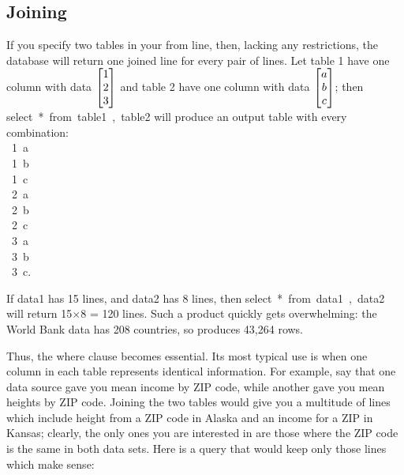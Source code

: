 
\subsection{Joining}
If you specify two tables in your \si{from} line, then, lacking any
restrictions, the database will return one joined line for every pair of lines.
Let table 1 have one column with data $\left[\begin{matrix}1\cr 2\cr 3\end{matrix}\right]$ and table 2 have one column
with data $\left[\begin{matrix}a\cr b\cr c\end{matrix}\right]$; then \si{select * from table1, table2} will
produce an output table with every combination:
\si{\\
1 a\\
1 b\\
1 c\\
2 a\\
2 b\\
2 c\\
3 a\\
3 b\\
3 c}. 

If \si{data1} has 15 lines, and \si{data2} has 8 lines, then
\si{select * from data1, data2} will return 15$\times$8 = 120 lines.
Such a product quickly gets overwhelming: the World Bank data has 208
countries, so  produces 43,264 rows. 



Thus, the \si{where} clause becomes essential. Its most typical use is
when one column in each table represents identical information. For
example, say that one data source gave you mean income by ZIP code,
while another gave you mean heights by ZIP code. Joining the two tables
would give you a multitude of lines which include height from a ZIP code
in Alaska and an income for a ZIP in Kansas; clearly, the only ones you
are interested in are those where the ZIP code is the same in both data
sets. Here is a query that would keep only those lines which make
sense:

